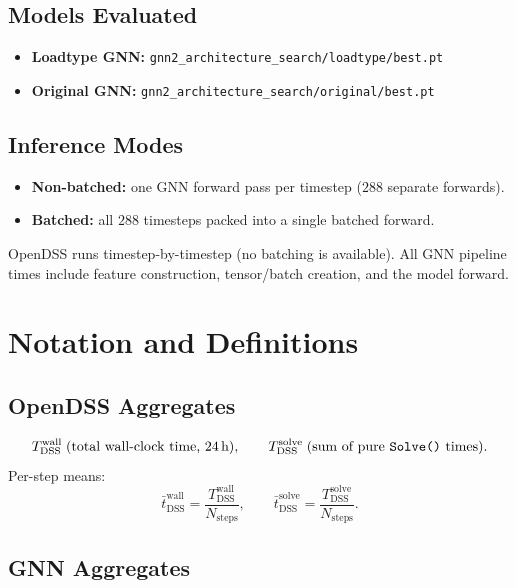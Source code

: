 \documentclass[11pt]{article}
\begin{document}
\subsection{Models Evaluated}

\begin{itemize}
  \item \textbf{Loadtype GNN:} \verb|gnn2_architecture_search/loadtype/best.pt|
  \item \textbf{Original GNN:} \verb|gnn2_architecture_search/original/best.pt|
\end{itemize}

\subsection{Inference Modes}

\begin{itemize}
  \item \textbf{Non-batched:} one GNN forward pass per timestep ($288$ separate forwards).
  \item \textbf{Batched:} all $288$ timesteps packed into a single batched forward.
\end{itemize}

OpenDSS runs timestep-by-timestep (no batching is available).  All GNN pipeline times
include feature construction, tensor/batch creation, and the model forward.

\section{Notation and Definitions}

\subsection{OpenDSS Aggregates}

\[
T^{\text{wall}}_{\text{DSS}} \;\text{(total wall-clock time, 24\,h)},
\qquad
T^{\text{solve}}_{\text{DSS}} \;\text{(sum of pure \texttt{Solve()} times)}.
\]
Per-step means:
\[
\bar{t}^{\text{wall}}_{\text{DSS}}
  = \frac{T^{\text{wall}}_{\text{DSS}}}{N_{\text{steps}}},
\qquad
\bar{t}^{\text{solve}}_{\text{DSS}}
  = \frac{T^{\text{solve}}_{\text{DSS}}}{N_{\text{steps}}}.
\]

\subsection{GNN Aggregates}
\end{document}
